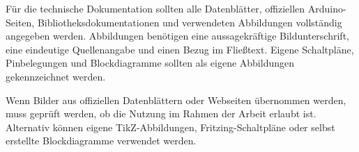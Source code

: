 Für die technische Dokumentation sollten alle Datenblätter, offiziellen Arduino-Seiten, Bibliotheksdokumentationen und verwendeten Abbildungen vollständig angegeben werden. Abbildungen benötigen eine aussagekräftige Bildunterschrift, eine eindeutige Quellenangabe und einen Bezug im Fließtext. Eigene Schaltpläne, Pinbelegungen und Blockdiagramme sollten als eigene Abbildungen gekennzeichnet werden.

Wenn Bilder aus offiziellen Datenblättern oder Webseiten übernommen werden, muss geprüft werden, ob die Nutzung im Rahmen der Arbeit erlaubt ist. Alternativ können eigene TikZ-Abbildungen, Fritzing-Schaltpläne oder selbst erstellte Blockdiagramme verwendet werden.

